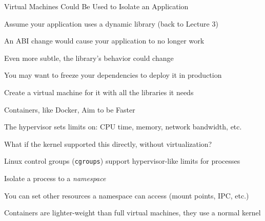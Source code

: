   \begin{frame}{Virtual Machines Could Be Used to Isolate an Application}

    Assume your application uses a dynamic library (back to Lecture 3)

    \hspace{2em} An ABI change would cause your application to no longer work

    \hspace{4em} Even more subtle, the library's behavior could change

    \vspace{2em}

    You may want to freeze your dependencies to deploy it in production

    \hspace{2em} Create a virtual machine for it with all the libraries it
                 needs
  \end{frame}

  \begin{frame}{Containers, like Docker, Aim to be Faster}

    The hypervisor sets limits on: CPU time, memory, network bandwidth, etc.

    \hspace{2em} What if the kernel supported this directly, without
                 virtualization?

    \vspace{2em}

    Linux control groups (\texttt{cgroups}) support hypervisor-like
    limits for processes

    \hspace{2em} Isolate a process to a \textit{namespace}

    \vspace{2em}

    You can set other resources a namespace can access (mount points, IPC, etc.)

    \vspace{2em}

    Containers are lighter-weight than full virtual machines, they use a normal
    kernel
  \end{frame}

